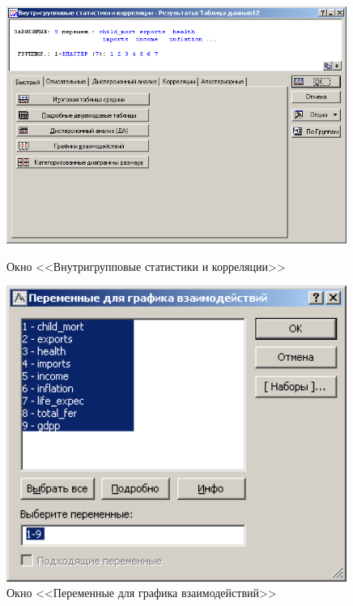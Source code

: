 \begin{figure}[!ph]
  \centering
  \begin{minipage}{0.49\textwidth}
    \centering

    \includegraphics[width=0.99\textwidth]
    {inc/cars_my/var5__3_19.PNG}

    \caption{Окно <<Внутригрупповые статистики и корреляции>>}
    \label{fig:var5__3_19}
  \end{minipage}
  \begin{minipage}{0.49\textwidth}
    \centering

    \includegraphics[width=0.99\textwidth]
    {inc/cars_my/var5__3_20.PNG}

    \caption{Окно <<Переменные для графика взаимодействий>>}
    \label{fig:var5__3_20}
  \end{minipage}
\end{figure}

